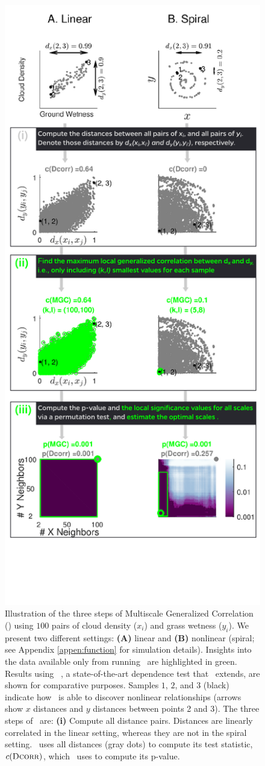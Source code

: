 \documentclass[11pt]{article}
\begin{document}
\begin{figure}
\includegraphics[width=0.54\linewidth]{Figures/Fig1Allb.pdf}
\caption{Illustration of the three steps of Multiscale Generalized Correlation (\Mgc)  using  $100$ pairs of cloud density ($x_i$) and grass wetness ($y_i$). 
We present two different settings: \textbf{(A)} linear  and \textbf{(B)} nonlinear (spiral; see Appendix \ref{appen:function} for simulation details). 
Insights into the data available only from running \Mgc~are highlighted in {\color{green}green.}  Results using \Dcorr~\cite{SzekelyRizzo2009}, a state-of-the-art dependence test that \Mgc~extends, are shown for comparative purposes. 
% 
Samples $1$, $2$, and $3$ (black) indicate how \Mgc~is able to discover nonlinear relationships (arrows show $x$ distances and $y$ distances between points 2 and 3). 
% 
The three steps of \Mgc~are:
% 
\textbf{(i)} Compute all distance pairs. Distances are linearly correlated in the linear setting, whereas they are not in the spiral setting.  \Dcorr~uses all distances (gray dots) to compute its test statistic, $c({\normalfont\textsc{Dcorr}})$, which \Dcorr~uses to compute its p-value.
}
\end{figure}
\end{document}
